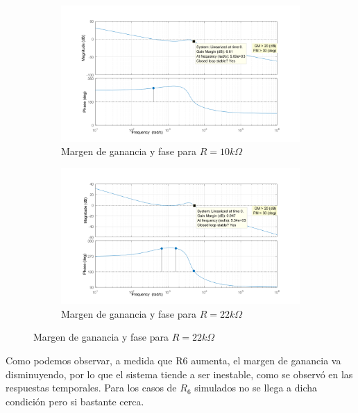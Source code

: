 \documentclass[e4_tp2_main.tex]{subfiles}
\begin{document}
\begin{figure}[H]
\begin{subfigure}[b]{0.5\textwidth}
    \includegraphics[width=\textwidth, height=\textwidth]{Imagenes/Punto1/fotosMarce/r10k.png}
    \caption{ Margen de ganancia y fase para $R=10 k\Omega $}
    \label{fig:f22}
  \end{subfigure}
	\hfill
  \begin{subfigure}[H] {0.5\textwidth}
  
    \includegraphics[width=\textwidth, height=\textwidth]{Imagenes/Punto1/fotosMarce/r22k.png}
    \caption{ Margen de ganancia y fase para $R=22 k\Omega$ }
      \label{fig:f13}
  \end{subfigure}

\end{figure}

Como podemos observar, a medida que R6 aumenta, el margen de ganancia va disminuyendo, por lo que el sistema tiende a ser inestable, como se observó en las respuestas temporales. Para los casos de $R_6$ simulados no se llega a dicha condición pero si bastante cerca.
\end{document}
